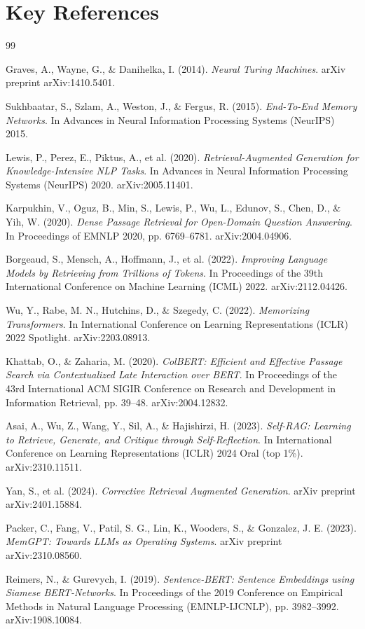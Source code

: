 \documentclass[11pt,letterpaper]{article}
\begin{document}
\section*{Key References}

\begin{thebibliography}{99}

Graves, A., Wayne, G., \& Danihelka, I. (2014).
\textit{Neural Turing Machines}.
arXiv preprint arXiv:1410.5401.

Sukhbaatar, S., Szlam, A., Weston, J., \& Fergus, R. (2015).
\textit{End-To-End Memory Networks}.
In Advances in Neural Information Processing Systems (NeurIPS) 2015.

Lewis, P., Perez, E., Piktus, A., et al. (2020).
\textit{Retrieval-Augmented Generation for Knowledge-Intensive NLP Tasks}.
In Advances in Neural Information Processing Systems (NeurIPS) 2020.
arXiv:2005.11401.

Karpukhin, V., Oguz, B., Min, S., Lewis, P., Wu, L., Edunov, S., Chen, D., \& Yih, W. (2020).
\textit{Dense Passage Retrieval for Open-Domain Question Answering}.
In Proceedings of EMNLP 2020, pp. 6769--6781.
arXiv:2004.04906.

Borgeaud, S., Mensch, A., Hoffmann, J., et al. (2022).
\textit{Improving Language Models by Retrieving from Trillions of Tokens}.
In Proceedings of the 39th International Conference on Machine Learning (ICML) 2022.
arXiv:2112.04426.

Wu, Y., Rabe, M. N., Hutchins, D., \& Szegedy, C. (2022).
\textit{Memorizing Transformers}.
In International Conference on Learning Representations (ICLR) 2022 Spotlight.
arXiv:2203.08913.

Khattab, O., \& Zaharia, M. (2020).
\textit{ColBERT: Efficient and Effective Passage Search via Contextualized Late Interaction over BERT}.
In Proceedings of the 43rd International ACM SIGIR Conference on Research and Development in Information Retrieval, pp. 39--48.
arXiv:2004.12832.

Asai, A., Wu, Z., Wang, Y., Sil, A., \& Hajishirzi, H. (2023).
\textit{Self-RAG: Learning to Retrieve, Generate, and Critique through Self-Reflection}.
In International Conference on Learning Representations (ICLR) 2024 Oral (top 1\%).
arXiv:2310.11511.

Yan, S., et al. (2024).
\textit{Corrective Retrieval Augmented Generation}.
arXiv preprint arXiv:2401.15884.

Packer, C., Fang, V., Patil, S. G., Lin, K., Wooders, S., \& Gonzalez, J. E. (2023).
\textit{MemGPT: Towards LLMs as Operating Systems}.
arXiv preprint arXiv:2310.08560.

Reimers, N., \& Gurevych, I. (2019).
\textit{Sentence-BERT: Sentence Embeddings using Siamese BERT-Networks}.
In Proceedings of the 2019 Conference on Empirical Methods in Natural Language Processing (EMNLP-IJCNLP), pp. 3982--3992.
arXiv:1908.10084.

\end{thebibliography}
\end{document}
